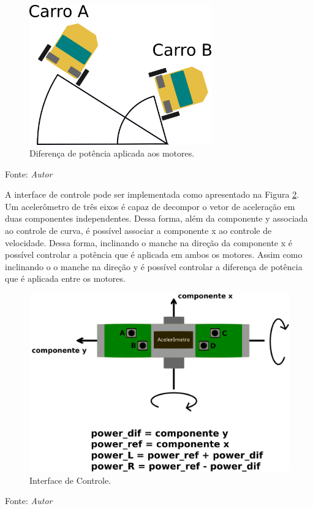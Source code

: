 \begin{figure}[!htb]
  \centering
  \caption{Diferença de potência aplicada aos motores.}
  \label{fig:angulo_dif_power}
  \includegraphics[width=0.7\textwidth]{./img/concepcao/angulo_dif_power.png}
\end{figure}
Fonte: \textit{Autor}

\pagebreak

A interface de controle pode ser implementada como apresentado na Figura \ref{fig:controle_acelerometro}. Um acelerômetro de três eixos é capaz de decompor o vetor de aceleração em duas componentes independentes. Dessa forma, além da componente y associada ao controle de curva, é possível associar a componente x ao controle de velocidade. Dessa forma, inclinando o manche na direção da componente x é possível controlar a potência que é aplicada em ambos os motores. Assim como inclinando o o manche na direção y é possível controlar a diferença de potência que é aplicada entre os motores. 

\begin{figure}[!htb]
  \centering
  \caption{Interface de Controle.}
  \label{fig:controle_acelerometro}
  \includegraphics[width=1\textwidth]{./img/concepcao/controle_acelerometro.png}
\end{figure}
Fonte: \textit{Autor}

